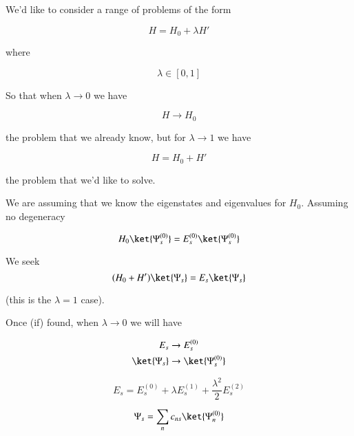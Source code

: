 We'd like to consider a range of problems of the form

\begin{equation}\label{eqn:qmTwoL3:330}
H = H_0 + \lambda H'
\end{equation}

where

\begin{equation}\label{eqn:qmTwoL3:350}
\lambda \in [0,1]
\end{equation}

So that when $\lambda \rightarrow 0$ we have

\begin{equation}\label{eqn:qmTwoL3:370}
H \rightarrow H_0
\end{equation}

the problem that we already know, but for $\lambda \rightarrow 1$ we have

\begin{equation}\label{eqn:qmTwoL3:390}
H = H_0 + H'
\end{equation}

the problem that we'd like to solve.

We are assuming that we know the eigenstates and eigenvalues for $H_0$.  Assuming no degeneracy

\begin{equation}\label{eqn:qmTwoL3:410}
H_0 \ket{\Psi_s^{(0)}} = 
E_s^{(0)}
\ket{\Psi_s^{(0)}} 
\end{equation}

We seek
\begin{equation}\label{eqn:qmTwoL3:430}
(H_0 + H')\ket{\Psi_s} = 
E_s
\ket{\Psi_s} 
\end{equation}

(this is the $\lambda = 1$ case).

Once (if) found, when $\lambda \rightarrow 0$ we will have

\begin{align*}
E_s &\rightarrow E_s^{(0)} \\
\ket{\Psi_s} &\rightarrow \ket{\Psi_s^{(0)}}
\end{align*}

\begin{equation}\label{eqn:qmTwoL3:450}
E_s = E_s^{(0)}  + \lambda E_s^{(1)} + \frac{\lambda^2}{2} E_s^{(2)}
\end{equation}

\begin{equation}\label{eqn:qmTwoL3:470}
\Psi_s = \sum_n c_{ns} \ket{\Psi_n^{(0)}}
\end{equation}

